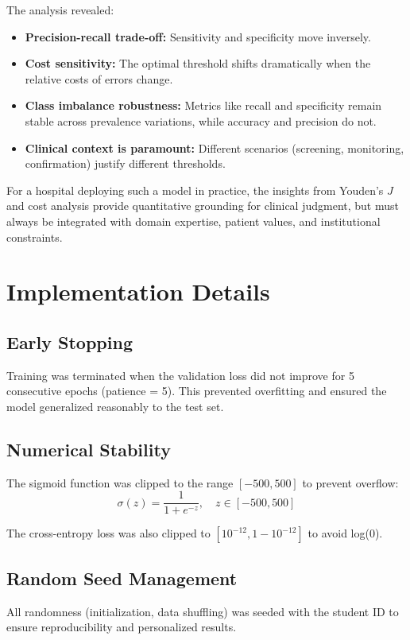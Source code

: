 \documentclass[11pt]{article}
\begin{document}
The analysis revealed:
\begin{itemize}
    \item \textbf{Precision-recall trade-off:} Sensitivity and specificity move inversely.
    \item \textbf{Cost sensitivity:} The optimal threshold shifts dramatically when the relative costs of errors change.
    \item \textbf{Class imbalance robustness:} Metrics like recall and specificity remain stable across prevalence variations, while accuracy and precision do not.
    \item \textbf{Clinical context is paramount:} Different scenarios (screening, monitoring, confirmation) justify different thresholds.
\end{itemize}

For a hospital deploying such a model in practice, the insights from Youden's $J$ and cost analysis provide quantitative grounding for clinical judgment, but must always be integrated with domain expertise, patient values, and institutional constraints.

\newpage

\appendix

\section{Implementation Details}

\subsection{Early Stopping}

Training was terminated when the validation loss did not improve for 5 consecutive epochs (patience = 5). This prevented overfitting and ensured the model generalized reasonably to the test set.

\subsection{Numerical Stability}

The sigmoid function was clipped to the range $[-500, 500]$ to prevent overflow:
\begin{equation}
    \sigma(z) = \frac{1}{1 + e^{-z}}, \quad z \in [-500, 500]
\end{equation}

The cross-entropy loss was also clipped to $[10^{-12}, 1 - 10^{-12}]$ to avoid log(0).

\subsection{Random Seed Management}

All randomness (initialization, data shuffling) was seeded with the student ID to ensure reproducibility and personalized results.
\end{document}
